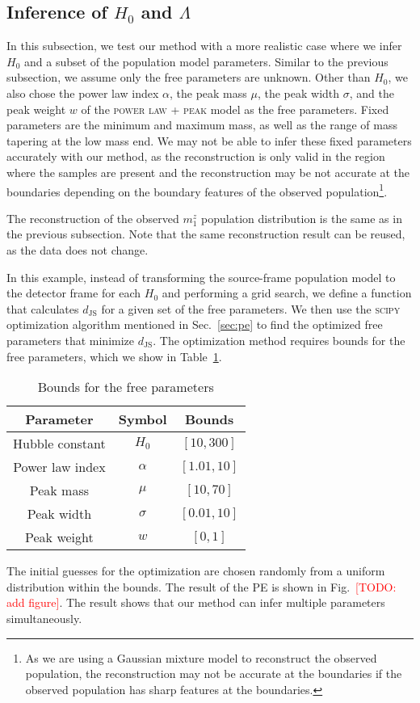 \documentclass[twocolumn]{aastex631}
\newcommand{\todo}[1]{\textcolor{red}{[TODO: #1]}}
\begin{document}
\subsection{Inference of $H_0$ and $\Lambda$}
\label{sec:inference_multi}

In this subsection, we test our method with a more realistic case where we infer $H_0$ and a subset of the population model parameters.
Similar to the previous subsection, we assume only the free parameters are unknown.
Other than $H_0$, we also chose the power law index $\alpha$, the peak mass $\mu$, the peak width $\sigma$, and the peak weight $w$ of the \textsc{power law + peak} model as the free parameters.
Fixed parameters are the minimum and maximum mass, as well as the range of mass tapering at the low mass end.
We may not be able to infer these fixed parameters accurately with our method, as the reconstruction is only valid in the region where the samples are present and the reconstruction may be not accurate at the boundaries depending on the boundary features of the observed population\footnote{As we are using a Gaussian mixture model to reconstruct the observed population, the reconstruction may not be accurate at the boundaries if the observed population has sharp features at the boundaries.}.

The reconstruction of the observed $m^z_1$ population distribution is the same as in the previous subsection.
Note that the same reconstruction result can be reused, as the data does not change.

In this example, instead of transforming the source-frame population model to the detector frame for each $H_0$ and performing a grid search, we define a function that calculates $d_\mathrm{JS}$ for a given set of the free parameters.
We then use the \textsc{scipy} optimization algorithm mentioned in Sec.~\ref{sec:pe} to find the optimized free parameters that minimize $d_\mathrm{JS}$.
The optimization method requires bounds for the free parameters, which we show in Table~\ref{tab:bounds}.
\begin{table}[h]
    \caption{Bounds for the free parameters}
    \begin{ruledtabular}
        \begin{tabular}{ccc}
            Parameter & Symbol & Bounds \\
            \hline
            Hubble constant & $H_0$ & $[10, 300]$ \\
            Power law index & $\alpha$ & $[1.01, 10]$ \\
            Peak mass & $\mu$ & $[10, 70]$ \\
            Peak width & $\sigma$ & $[0.01, 10]$ \\
            Peak weight & $w$ & $[0, 1]$ \\
        \end{tabular}
    \end{ruledtabular}
    \label{tab:bounds}
\end{table}
The initial guesses for the optimization are chosen randomly from a uniform distribution within the bounds.
The result of the \ac{PE} is shown in Fig.~\todo{add figure}.
The result shows that our method can infer multiple parameters simultaneously.
\end{document}
